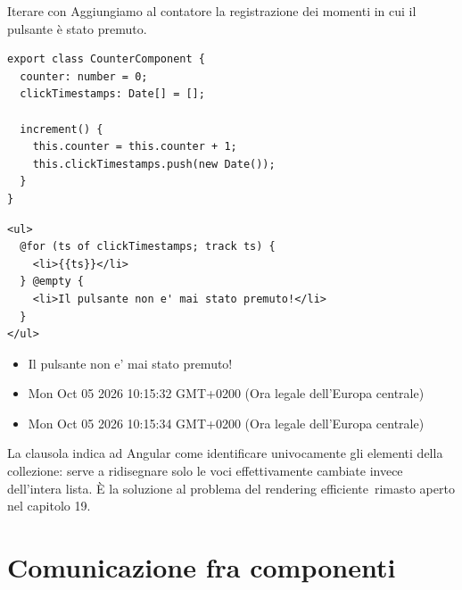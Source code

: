 \begin{esempio}{Iterare con }
Aggiungiamo al contatore la registrazione dei momenti in cui il pulsante è
stato premuto.

\begin{lstlisting}[style=ts, name=counter.component.ts]
export class CounterComponent {
  counter: number = 0;
  clickTimestamps: Date[] = [];

  increment() {
    this.counter = this.counter + 1;
    this.clickTimestamps.push(new Date());
  }
}
\end{lstlisting}

\begin{affianco}[0.4][c]
\codicepiccolo
\begin{lstlisting}[style=html, name=counter.component.html]
<ul>
  @for (ts of clickTimestamps; track ts) {
    <li>{{ts}}</li>
  } @empty {
    <li>Il pulsante non e' mai stato premuto!</li>
  }
</ul>
\end{lstlisting}
\risultato
\begin{browser}
  \begin{itemize}[leftmargin=14pt, itemsep=0pt, topsep=0pt]
    \item Il pulsante non e' mai stato premuto!
  \end{itemize}
\end{browser}
\begin{browser}
  \footnotesize
  \begin{itemize}[leftmargin=14pt, itemsep=0pt, topsep=0pt]
    \item Mon Oct 05 2026 10:15:32 GMT+0200 (Ora legale dell'Europa centrale)
    \item Mon Oct 05 2026 10:15:34 GMT+0200 (Ora legale dell'Europa centrale)
  \end{itemize}
\end{browser}
\end{affianco}

La clausola  indica ad Angular come identificare univocamente gli
elementi della collezione: serve a ridisegnare solo le voci effettivamente
cambiate invece dell'intera lista. È la soluzione al problema del
\guillemotleft rendering efficiente\guillemotright\ rimasto aperto nel capitolo 19.
\end{esempio}

\section{Comunicazione fra componenti}

